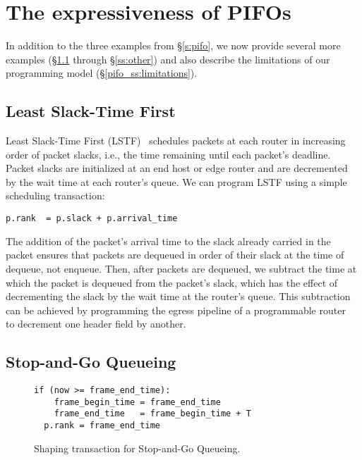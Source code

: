 \section{The expressiveness of PIFOs}
\label{s:expressive}

In addition to the three examples from \S\ref{s:pifo}, we now provide
several more examples (\S\ref{ss:lstf} through \S\ref{ss:other}) and
also describe the limitations of our programming model
(\S\ref{pifo_ss:limitations}).

%

\subsection{Least Slack-Time First}
\label{ss:lstf}

Least Slack-Time First (LSTF)~\cite{lstf,ups} schedules packets at
  each router in increasing order of packet slacks, i.e., the time
  remaining until each packet's deadline.  Packet slacks are
  initialized at an end host or edge router and are decremented by the
  wait time at each router's queue. We can program LSTF using a simple 
  scheduling transaction:
\begin{lstlisting}[style=customc]
  p.rank  = p.slack + p.arrival_time
\end{lstlisting}

The addition of the packet's arrival time to the slack already carried
in the packet ensures that packets are dequeued in order of their
slack at the time of dequeue, not enqueue. Then, after packets are
dequeued, we subtract the time at which the packet is dequeued from
the packet's slack, which has the effect of decrementing the slack by
the wait time at the router's queue. This subtraction can be achieved
by programming the egress pipeline of a programmable router~\cite{rmt}
to decrement one header field by another.

\subsection{Stop-and-Go Queueing}
\label{ss:stopngo}

\begin{figure}[h]
  \begin{lstlisting}[style=customc]
  if (now >= frame_end_time):
    frame_begin_time = frame_end_time
    frame_end_time   = frame_begin_time + T
  p.rank = frame_end_time
  \end{lstlisting}
\caption{Shaping transaction for Stop-and-Go Queueing.}
\label{fig:stopngo}
\end{figure}

